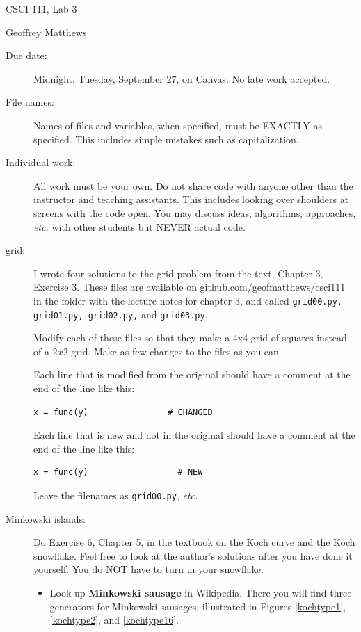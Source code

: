 \documentclass[12pt]{article}
\begin{document}
\sloppy
\centerline{\Large CSCI 111, Lab 3}
\centerline{\large Geoffrey Matthews}

\begin{description}
\item[Due date:] Midnight, Tuesday, September 27, on Canvas.
No late work accepted.  

\item[File names:]  Names of files and variables, when specified,
must be EXACTLY as specified.  This includes simple mistakes such
as capitalization.

\item[Individual work:]  All work must be your own.  Do not share
code with anyone other than the instructor and teaching assistants.
This includes looking over shoulders at screens with the code open.
You may discuss ideas, algorithms, approaches, {\em etc.} with
other students but NEVER actual code.

\item[grid:] 
I wrote four solutions to the grid problem from the text,
Chapter 3, Exercise 3.  These files are available on github.com/geofmatthews/csci111
in the folder with the lecture notes for chapter 3, and called {\tt grid00.py,
grid01.py, grid02.py,} and {\tt grid03.py}.

Modify each of these files so that they make a 4x4 grid of squares
instead of a $2x2$ grid.  Make as few changes to the files as you can.

Each line that is modified from the original should have a comment
at the end of the line like this:
\begin{verbatim}
x = func(y)                # CHANGED
\end{verbatim}
Each line that is new  and not in the original should have a comment
at the end of the line like this:
\begin{verbatim}
x = func(y)                  # NEW
\end{verbatim}

Leave the filenames as {\tt grid00.py}, {\em etc.}



\item[Minkowski islands:]  Do Exercise 6, Chapter 5, in the textbook 
on the Koch curve and the Koch snowflake.  Feel free to look at
the author's solutions after you have done it yourself.  You do NOT
have to turn in your snowflake.

\begin{itemize}
\item Look up {\bf Minkowski sausage} in Wikipedia.  There
you will find three generators for Minkowski sausages, illustrated
in Figures \ref{kochtype1}, \ref{kochtype2}, and \ref{kochtype16}.



\end{itemize}
\end{description}
\end{document}
